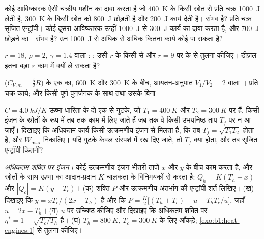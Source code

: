 \begin{exercise}[$\star\star$]\label{exo:b1:heat-engines:6}
कोई आविष्कारक ऐसी चक्रीय मशीन का दावा करता है जो \qty{400}{K} के किसी
स्रोत से प्रति चक्र \qty{1000}{J} लेती है, \qty{300}{K} के किसी स्रोत को
\qty{800}{J} छोड़ती है और \qty{200}{J} कार्य देती है। संभव है? प्रति चक्र
सृजित एन्ट्रॉपी। कोई दूसरा आविष्कारक उन्हीं \qty{1000}{J} से \qty{300}{J}
कार्य का दावा करता है, और \qty{700}{J} छोड़ने का। संभव है? उन \qty{1000}{J}
से अधिक से अधिक कितना कार्य कोई पा सकता है?
\end{exercise}

\begin{exercise}[$\star\star$]\label{exo:b1:heat-engines:7}
$r = 18$, $\rho = 2$, $\gamma = 1.4$ वाला : ; उसी $r$ के
किसी  से और $r = 9$ पर के  से तुलना कीजिए। डीज़ल इतना बड़ा
$r$ काम में क्यों ले सकता है?
\end{exercise}

\begin{exercise}[$\star\star$]\label{exo:b1:heat-engines:8}
 ($C_{V,m} = \tfrac52R$) के एक  का, \qty{600}{K} और
\qty{300}{K} के बीच, आयतन-अनुपात $V_1/V_2 = 2$ वाला । प्रति
चक्र कार्य; और किसी पूर्ण पुनर्जनक के साथ तथा उसके बिना ।
\end{exercise}

\begin{exercise}[$\star\star$]\label{exo:b1:heat-engines:9}
$C = \qty{4.0}{kJ/K}$ ऊष्मा धारिता के दो एक-से गुटके, जो $T_1 =
\qty{400}{K}$ और $T_2 = \qty{300}{K}$ पर हैं, किसी इंजन के स्रोतों के रूप
में तब तक काम में लिए जाते हैं जब तक वे किसी उभयनिष्ठ ताप $T_f$ पर न आ
जाएँ। दिखाइए कि अधिकतम कार्य किसी उत्क्रमणीय इंजन से मिलता है, कि तब
$T_f = \sqrt{T_1T_2}$ होता है, और $W_{\max}$ निकालिए। यदि गुटके केवल
संस्पर्श में रख दिए जाते, तो $T_f$ क्या होता, और तब सृजित एन्ट्रॉपी कितनी?
\end{exercise}

\begin{exercise}[$\star\star\star$]\label{exo:b1:heat-engines:10}
\emph{अधिकतम शक्ति पर इंजन।} कोई उत्क्रमणीय इंजन भीतरी तापों
$x$ और $y$ के बीच काम करता है, और स्रोतों के साथ ऊष्मा का आदान-प्रदान
$K$ चालकता के विनिमयकों से करता है: $\dot Q_h = K(T_h - x)$ और
$|\dot Q_c| = K(y - T_c)$। (क) शक्ति $P$ और उत्क्रमणीय अंतर्भाग की
एन्ट्रॉपी-शर्त लिखिए। (ख) दिखाइए कि $y = xT_c/(2x - T_h)$ है और
कि $P = \frac{K}{2}\bigl[(T_h + T_c) - u - T_hT_c/u\bigr]$, जहाँ $u = 2x - T_h$।
(ग) $u$ पर उच्चिष्ठ कीजिए और दिखाइए कि अधिकतम शक्ति पर 
$\eta^\ast = 1 - \sqrt{T_c/T_h}$ है। (घ) $T_h = \qty{800}{K}$,
$T_c = \qty{300}{K}$ के लिए आँकड़े; \cref{exo:b1:heat-engines:1} से तुलना कीजिए।
\end{exercise}

